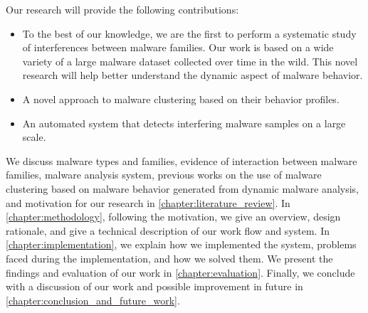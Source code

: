 Our research will provide the following contributions:
\begin{itemize}
  \item To the best of our knowledge, we are the first to perform a systematic study of interferences between malware families.
    Our work is based on a wide variety of a large malware dataset collected over time in the wild.
    This novel research will help better understand the dynamic aspect of malware behavior.
  \item A novel approach to malware clustering based on their behavior profiles.
  \item An automated system that detects interfering malware samples on a large scale.
\end{itemize}
We discuss malware types and families, evidence of interaction between malware families, malware analysis system, previous works on the use of malware clustering based on malware behavior generated from dynamic malware analysis, and motivation for our research in \autoref{chapter:literature_review}.
In \autoref{chapter:methodology}, following the motivation, we give an overview, design rationale, and give a technical description of our work flow and system.
In \autoref{chapter:implementation}, we explain how we implemented the system, problems faced during the implementation, and how we solved them.
We present the findings and evaluation of our work in \autoref{chapter:evaluation}.
Finally, we conclude with a discussion of our work and possible improvement in future in \autoref{chapter:conclusion_and_future_work}.
